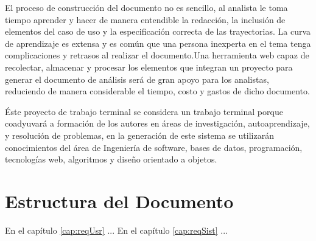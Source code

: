El proceso de construcción del documento no es sencillo, al analista le toma tiempo aprender y hacer de manera entendible la redacción, la inclusión de elementos del caso de uso y la especificación correcta de las trayectorias. La curva de aprendizaje es extensa y es común que una persona inexperta en el tema tenga complicaciones y retrasos al realizar el documento.Una herramienta web capaz de recolectar, almacenar y procesar los elementos que integran un proyecto para generar el documento de análisis será de gran apoyo para los analistas, reduciendo de manera considerable el tiempo, costo y gastos de dicho documento. 

Éste proyecto de trabajo terminal se considera un trabajo terminal porque coadyuvará a formación de los autores en áreas de investigación, autoaprendizaje, y resolución de problemas,  en la generación de este sistema se utilizarán conocimientos del área de Ingeniería de software, bases de datos, programación, tecnologías web, algoritmos y diseño orientado a objetos.


\section{Estructura del Documento}

En el capítulo \ref{cap:reqUsr} ...
En el capítulo \ref{cap:reqSist} ...
